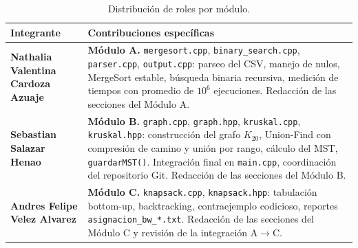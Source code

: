 \documentclass[11pt, a4paper]{article}
\begin{document}
\begin{table}[h!]
\centering\small
\begin{tabularx}{\textwidth}{
  >{\raggedright\arraybackslash}p{4.2cm}
  >{\raggedright\arraybackslash}X
}
\toprule
\textbf{Integrante} & \textbf{Contribuciones específicas} \\
\midrule
\textbf{Nathalia Valentina Cardoza Azuaje} &
  \textbf{Módulo A.} \texttt{mergesort.cpp}, \texttt{binary\_search.cpp},
  \texttt{parser.cpp}, \texttt{output.cpp}: parseo del CSV, manejo de nulos,
  MergeSort estable, búsqueda binaria recursiva, medición de tiempos con
  promedio de $10^6$ ejecuciones. Redacción de las secciones del Módulo A. \\[4pt]
\textbf{Sebastian Salazar Henao} &
  \textbf{Módulo B.} \texttt{graph.cpp}, \texttt{graph.hpp},
  \texttt{kruskal.cpp}, \texttt{kruskal.hpp}: construcción del grafo $K_{20}$,
  Union-Find con compresión de camino y unión por rango, cálculo del MST,
  \texttt{guardarMST()}. Integración final en \texttt{main.cpp}, coordinación
  del repositorio Git. Redacción de las secciones del Módulo B. \\[4pt]
\textbf{Andres Felipe Velez Alvarez} &
  \textbf{Módulo C.} \texttt{knapsack.cpp}, \texttt{knapsack.hpp}:
  tabulación bottom-up, backtracking, contraejemplo codicioso, reportes
  \texttt{asignacion\_bw\_*.txt}. Redacción de las secciones del Módulo C
  y revisión de la integración A$\to$C. \\
\bottomrule
\end{tabularx}
\caption{Distribución de roles por módulo.}
\end{table}
\end{document}

